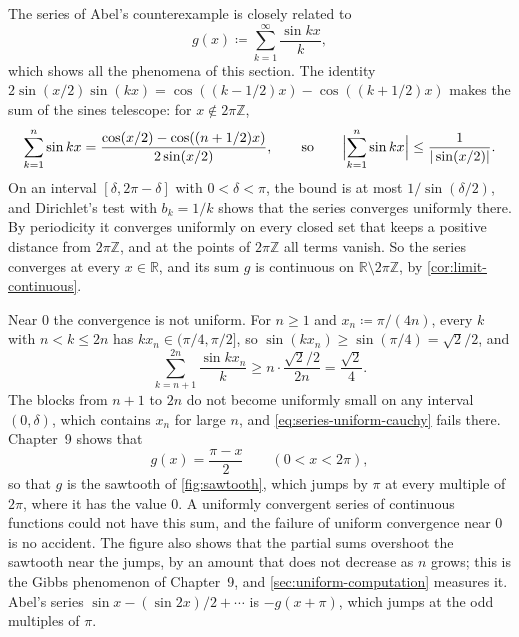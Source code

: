 The series of Abel's counterexample is closely related to
\begin{equation}
g(x)\coloneqq\sum_{k=1}^\infty\frac{\sin kx}k ,
\label{eq:sawtooth}
\end{equation}
which shows all the phenomena of this section. The identity $2\sin(x/2)\sin(kx)=\cos((k-1/2)x)-\cos((k+1/2)x)$ makes the sum of the sines telescope: for $x\notin2\pi\mathbb Z$,
\[
\sum_{k=1}^n\sin kx=\frac{\cos(x/2)-\cos((n+1/2)x)}{2\sin(x/2)},\qquad\text{so}\qquad\Bigl|\sum_{k=1}^n\sin kx\Bigr|\le\frac1{|\sin(x/2)|} .
\]
On an interval $[\delta,2\pi-\delta]$ with $0<\delta<\pi$, the bound is at most $1/\sin(\delta/2)$, and Dirichlet's test with $b_k=1/k$ shows that the series converges uniformly there. By periodicity it converges uniformly on every closed set that keeps a positive distance from $2\pi\mathbb Z$, and at the points of $2\pi\mathbb Z$ all terms vanish. So the series converges at every $x\in\mathbb R$, and its sum $g$ is continuous on $\mathbb R\setminus2\pi\mathbb Z$, by \cref{cor:limit-continuous}.

Near $0$ the convergence is not uniform. For $n\ge1$ and $x_n\coloneqq\pi/(4n)$, every $k$ with $n<k\le2n$ has $kx_n\in(\pi/4,\pi/2]$, so $\sin(kx_n)\ge\sin(\pi/4)=\sqrt2/2$, and
\[
\sum_{k=n+1}^{2n}\frac{\sin kx_n}k\ge n\cdot\frac{\sqrt2/2}{2n}=\frac{\sqrt2}4 .
\]
The blocks from $n+1$ to $2n$ do not become uniformly small on any interval $(0,\delta)$, which contains $x_n$ for large $n$, and \eqref{eq:series-uniform-cauchy} fails there. Chapter~9 shows that
\[
g(x)=\frac{\pi-x}2\qquad(0<x<2\pi),
\]
so that $g$ is the sawtooth of \cref{fig:sawtooth}, which jumps by $\pi$ at every multiple of $2\pi$, where it has the value $0$. A uniformly convergent series of continuous functions could not have this sum, and the failure of uniform convergence near $0$ is no accident. The figure also shows that the partial sums overshoot the sawtooth near the jumps, by an amount that does not decrease as $n$ grows; this is the Gibbs phenomenon of Chapter~9, and \cref{sec:uniform-computation} measures it. Abel's series $\sin x-(\sin2x)/2+\cdots$ is $-g(x+\pi)$, which jumps at the odd multiples of $\pi$.

